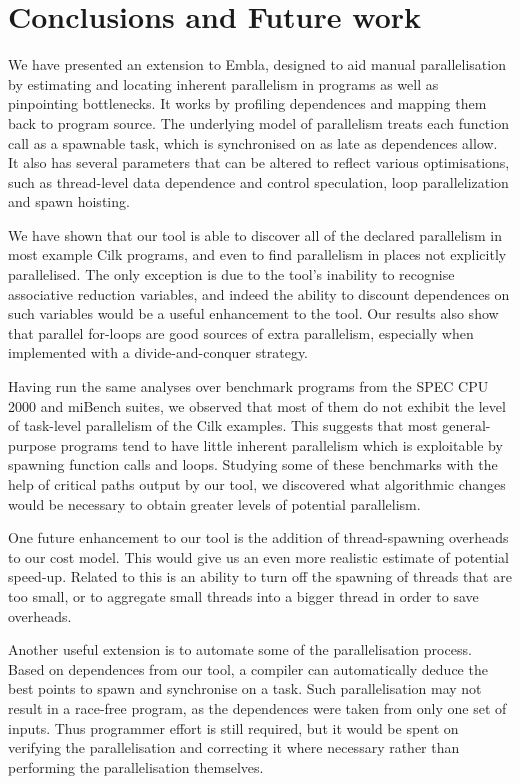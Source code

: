 \section{Conclusions and Future work}

We have presented an extension to Embla, designed to aid manual parallelisation by estimating and locating inherent parallelism in programs as well as pinpointing bottlenecks.
It works by profiling dependences and mapping them back to program source.
The underlying model of parallelism treats each function call as a spawnable task, which is synchronised on as late as dependences allow.
It also has several parameters that can be altered to reflect various optimisations, such as thread-level data dependence and control speculation, loop parallelization and spawn hoisting.

We have shown that our tool is able to discover all of the declared parallelism in most example Cilk programs, and even to find parallelism in places not explicitly parallelised.
The only exception is due to the tool's inability to recognise associative reduction variables, and indeed the ability to discount dependences on such variables would be a useful enhancement to the tool.
Our results also show that parallel for-loops are good sources of extra parallelism, especially when implemented with a divide-and-conquer strategy.

Having run the same analyses over benchmark programs from the SPEC CPU 2000 and miBench suites, we observed that most of them do not exhibit the level of task-level parallelism of the Cilk examples.
This suggests that most general-purpose programs tend to have little inherent parallelism which is exploitable by spawning function calls and loops.
Studying some of these benchmarks with the help of critical paths output by our tool, we discovered what algorithmic changes would be necessary to obtain greater levels of potential parallelism.

One future enhancement to our tool is the addition of thread-spawning overheads to our cost model.
This would give us an even more realistic estimate of potential speed-up.
Related to this is an ability to turn off the spawning of threads that are too small, or to aggregate small threads into a bigger thread in order to save overheads.

Another useful extension is to automate some of the parallelisation process.
Based on dependences from our tool, a compiler can automatically deduce the best points to spawn and synchronise on a task.
Such parallelisation may not result in a race-free program, as the dependences were taken from only one set of inputs.
Thus programmer effort is still required, but it would be spent on verifying the parallelisation and correcting it where necessary rather than performing the parallelisation themselves.
